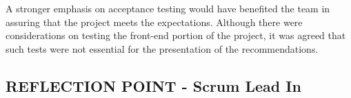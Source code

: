 \documentclass{l3proj}
\begin{document}
A stronger emphasis on acceptance testing would have benefited the team in assuring that the project meets the expectations. Although there were considerations on testing the front-end portion of the project, it was agreed that such tests were not essential for the presentation of the recommendations.

%
%



\subsection{REFLECTION POINT - Scrum Lead In}
\label{sec:teamstructure}
\end{document}
